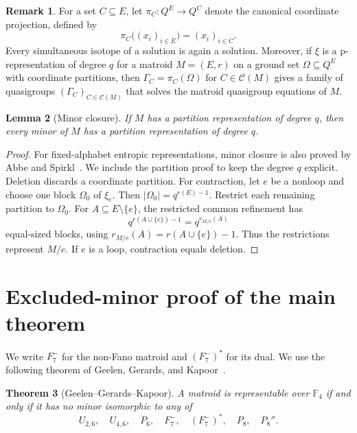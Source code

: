 \documentclass[preprint,12pt]{elsarticle}
\newtheorem{theorem}{Theorem}[section]
\newtheorem{lemma}[theorem]{Lemma}
\theoremstyle{definition}
\newtheorem{remark}[theorem]{Remark}
\newcommand{\F}{\mathbb F}
\begin{document}
\begin{remark}\label{rem:isotopy-invariance}
For a set $C\subseteq E$, let $\pi_C:Q^E\to Q^C$ denote the canonical coordinate projection, defined by
\[
\pi_C\bigl((x_i)_{i\in E}\bigr)=(x_i)_{i\in C}.
\]
Every simultaneous isotope of a solution is again a solution. Moreover, if $\xi$ is a p-representation of degree $q$ for a matroid $M=(E,r)$ on a ground set $\Omega\subseteq Q^E$ with coordinate partitions, then $\Gamma_C=\pi_C(\Omega)$ for $C\in\mathcal C(M)$ gives a family of quasigroups $(\Gamma_C)_{C\in\mathcal C(M)}$ that solves the matroid quasigroup equations of $M$.
\end{remark}

\begin{lemma}[Minor closure]\label{lem:minor}
If $M$ has a partition representation of degree $q$, then every minor of $M$ has a partition representation of degree $q$.
\end{lemma}

\begin{proof}
{For fixed-alphabet entropic representations, minor closure is also proved by
Abbe and Spirkl~\cite[Lemma~2]{AbbeSpirkl2019}. We include the partition proof
to keep the degree $q$ explicit.}
Deletion discards a coordinate partition. For contraction, let $e$ be a nonloop and choose one block $\Omega_0$ of $\xi_e$. Then $|\Omega_0|=q^{r(E)-1}$. Restrict each remaining partition to $\Omega_0$. For $A\subseteq E\setminus\{e\}$, the restricted common refinement has
\[
q^{r(A\cup\{e\})-1}=q^{r_{M/e}(A)}
\]
equal-sized blocks, using $r_{M/e}(A)=r(A\cup\{e\})-1$. Thus the restrictions represent $M/e$. If $e$ is a loop, contraction equals deletion.
\end{proof}

\section{Excluded-minor proof of the main theorem}\label{sec:reduction}

We write $F_7^-$ for the non-Fano matroid and $(F_7^-)^*$ for its dual. We use the following theorem of Geelen, Gerards, and Kapoor~\cite{GeelenGerardsKapoor2000}.

\begin{theorem}[Geelen--Gerards--Kapoor]\label{thm:ggk}
A matroid is representable over $\F_4$ if and only if it has no minor isomorphic to any of
\[
U_{2,6},\quad U_{4,6},\quad P_6,\quad F_7^-,\quad (F_7^-)^*,\quad P_8,\quad P_8''.
\]
\end{theorem}
\end{document}

